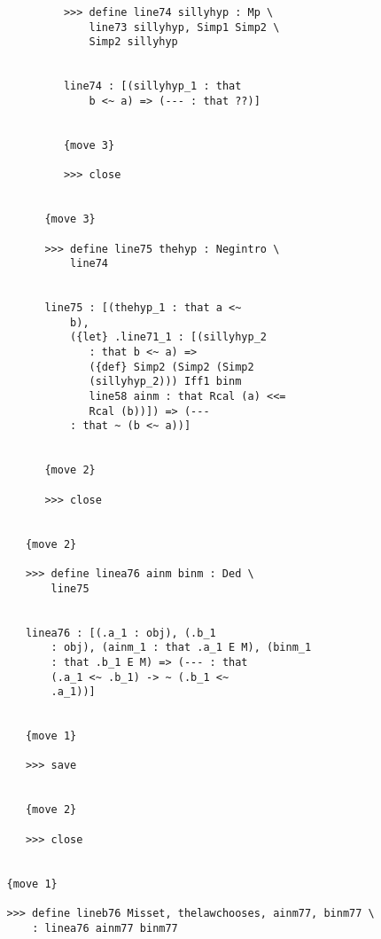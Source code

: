 \documentclass[12pt]{article}
\begin{document}
\begin{verbatim}
            >>> define line74 sillyhyp : Mp \
                line73 sillyhyp, Simp1 Simp2 \
                Simp2 sillyhyp


            line74 : [(sillyhyp_1 : that 
                b <~ a) => (--- : that ??)]


            {move 3}

            >>> close


         {move 3}

         >>> define line75 thehyp : Negintro \
             line74


         line75 : [(thehyp_1 : that a <~ 
             b), 
             ({let} .line71_1 : [(sillyhyp_2 
                : that b <~ a) => 
                ({def} Simp2 (Simp2 (Simp2 
                (sillyhyp_2))) Iff1 binm 
                line58 ainm : that Rcal (a) <<= 
                Rcal (b))]) => (--- 
             : that ~ (b <~ a))]


         {move 2}

         >>> close


      {move 2}

      >>> define linea76 ainm binm : Ded \
          line75


      linea76 : [(.a_1 : obj), (.b_1 
          : obj), (ainm_1 : that .a_1 E M), (binm_1 
          : that .b_1 E M) => (--- : that 
          (.a_1 <~ .b_1) -> ~ (.b_1 <~ 
          .a_1))]


      {move 1}

      >>> save


      {move 2}

      >>> close


   {move 1}

   >>> define lineb76 Misset, thelawchooses, ainm77, binm77 \
       : linea76 ainm77 binm77



\end{verbatim}
\end{document}
